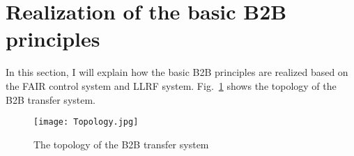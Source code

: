 \section{Realization of the basic B2B principles}
In this section, I will explain how the basic B2B principles are realized based on the FAIR control system and LLRF system.
Fig.~\ref{Topology} shows the topology of the B2B transfer system.
\begin{figure}[!htb]
   \centering   
   \texttt{[image: Topology.jpg]}
   \caption{The topology of the B2B transfer system}
   \label{Topology}
\end{figure}
